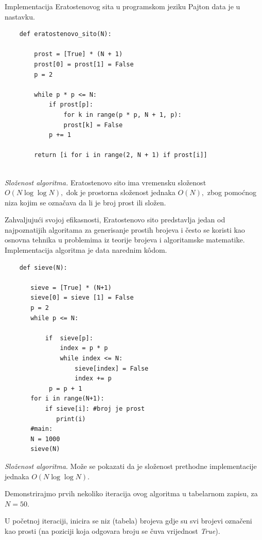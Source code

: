 \medskip

Implementacija Eratostenovog sita u programskom jeziku Pajton data je u nastavku.

\begin{verbatim}
	def eratostenovo_sito(N):
	
	    prost = [True] * (N + 1)
	    prost[0] = prost[1] = False
	    p = 2
	
	    while p * p <= N:
	        if prost[p]:
	            for k in range(p * p, N + 1, p):
	            prost[k] = False
	        p += 1
	
	    return [i for i in range(2, N + 1) if prost[i]]
	
\end{verbatim}

\textit{Složenost algoritma.} Eratostenovo sito ima vremensku složenost $O(N \log \log N),$ dok je prostorna složenost jednaka $O(N),$ zbog pomoćnog niza kojim se označava da li je broj prost ili složen.

Zahvaljujući svojoj efikasnosti, Eratostenovo sito predstavlja jedan od najpoznatijih algoritama za generisanje prostih brojeva i često se koristi kao osnovna tehnika u problemima iz teorije brojeva i algoritamske matematike. Implementacija algoritma je data narednim k\^odom. 

\begin{verbatim}
	def sieve(N):
	   
	   sieve = [True] * (N+1)
	   sieve[0] = sieve [1] = False
	   p = 2   
	   while p <= N:
	       
	       if  sieve[p]:
	           index = p * p
	           while index <= N:
	               sieve[index] = False
	               index += p   
	        p = p + 1
	   for i in range(N+1):
	       if sieve[i]: #broj je prost
	          print(i)
       #main:
       N = 1000
       sieve(N)
\end{verbatim}  
\textit{Složenost algoritma}.  Može se pokazati da je složenost prethodne implementacije jednaka $O(N \log\log N )$. 


Demonstrirajmo   prvih nekoliko iteracija ovog algoritma u tabelarnom zapisu, za $N=50.$ 

U početnoj iteraciji, inicira se niz (tabela) brojeva gdje su svi brojevi označeni kao prosti (na poziciji koja odgovara broju se čuva vrijednost \emph{True}).


